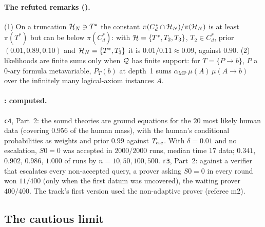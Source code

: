 \paragraph{The refuted remarks ().} (1) On a truncation $\mathcal{H}_N\ni T^*$ the constant $\pi(C^*_d\cap\mathcal{H}_N)/\pi(\mathcal{H}_N)$ is at least $\pi(T^*)$ but can be below $\pi(C^*_d)$: with $\mathcal{H}=\{T^*,T_2,T_3\}$, $T_2\in C^*_d$, prior $(0.01,0.89,0.10)$ and $\mathcal{H}_N=\{T^*,T_3\}$ it is $0.01/0.11\approx0.09$, against $0.90$. (2) \Ltwo{} likelihoods are finite sums only when $\mathcal{Q}$ has finite support: for $T=\{P\to b\}$, $P$ a $0$-ary formula metavariable, $P_T(b)$ at depth~1 sums $\alpha_{\mathrm{MP}}\,\mu(A)\,\mu(A\to b)$ over the infinitely many logical-axiom instances $A$.

\paragraph{: computed.} \texttt{c4}, Part~2: the sound theories are ground equations for the $20$ most likely human data (covering $0.956$ of the human mass), with the human's conditional probabilities as weights and prior $0.99$ against $T_{\mathrm{esc}}$. With $\delta=0.01$ and no escalation, $S0=0$ was accepted in $2000/2000$ runs, median time $17$ data; $0.341$, $0.902$, $0.986$, $1.000$ of runs by $n=10,50,100,500$. \texttt{r3}, Part~2: against a verifier that escalates every non-accepted query, a prover asking $S0=0$ in every round won $11/400$ (only when the first datum was uncovered), the waiting prover $400/400$. The track's first version used the non-adaptive prover (referee m2).

\subsection{The cautious limit}\label{app:sound:cautious}

